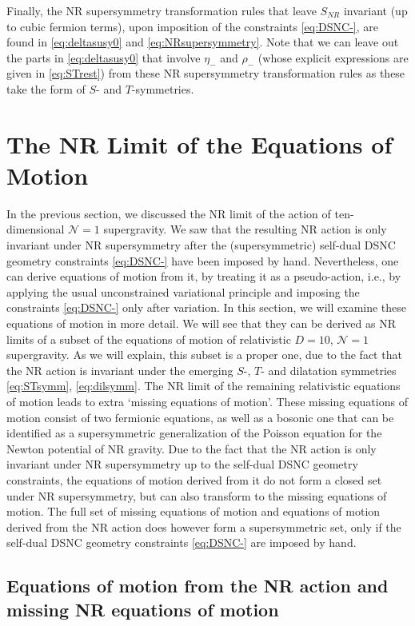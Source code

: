 \documentclass[a4paper,10pt,openany]{article}
\begin{document}
	Finally, the NR supersymmetry transformation rules that leave $S_{NR}$ invariant (up to cubic fermion terms), upon imposition of the constraints \eqref{eq:DSNC-}, are found in \eqref{eq:deltasusy0} and \eqref{eq:NRsupersymmetry}. Note that we can leave out the parts in \eqref{eq:deltasusy0} that involve $\eta_-$ and $\rho_-$ (whose explicit expressions are given in \eqref{eq:STrest}) from these NR supersymmetry transformation rules as these take the form of $S$- and $T$-symmetries.
	
	\section{The NR Limit of the Equations of Motion} \label{sec:limiteoms}
	
	In the previous section, we discussed the NR limit of the action of ten-dimensional $\mathcal{N}=1$ supergravity. We saw that the resulting NR action is only invariant under NR supersymmetry after the (supersymmetric) self-dual DSNC geometry constraints \eqref{eq:DSNC-} have been imposed by hand. Nevertheless, one can derive equations of motion from it, by treating it as a pseudo-action, i.e., by applying the usual unconstrained variational principle and imposing the constraints \eqref{eq:DSNC-} only after variation. In this section, we will examine these equations of motion in more detail. We will see that they can be derived as NR limits of a subset of the equations of motion of relativistic $D=10$, $\mathcal{N}=1$ supergravity. As we will explain, this subset is a proper one, due to the fact that the NR action is invariant under the emerging $S$-, $T$- and dilatation symmetries \eqref{eq:STsymm}, \eqref{eq:dilsymm}. The NR limit of the remaining relativistic equations of motion leads to extra `missing equations of motion'. These missing equations of motion consist of two fermionic equations, as well as a bosonic one that can be identified as a supersymmetric generalization of the Poisson equation for the Newton potential of NR gravity. Due to the fact that the NR action is only invariant under NR supersymmetry up to the self-dual DSNC geometry constraints, the equations of motion derived from it do not form a closed set under NR supersymmetry, but can also transform to the missing equations of motion. The full set of missing equations of motion and equations of motion derived from the NR action does however form a supersymmetric set, only if the self-dual DSNC geometry constraints \eqref{eq:DSNC-} are imposed by hand.
	
	\subsection{Equations of motion from the NR action and missing NR equations of motion}
	
\end{document}
